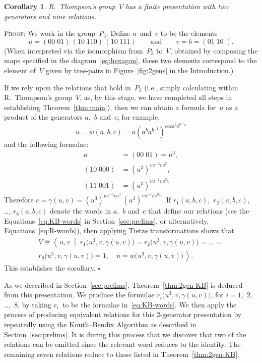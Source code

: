 \documentclass[a4paper,11pt]{article}
\numberwithin{equation}{section}
\newcommand{\nbd}{\nobreakdash-}
\newcommand{\swap}[2]{(#1\;#2)}
\newcommand{\qed}{\hspace*{\fill}$\square$}
\newtheorem{cor}[thm]{Corollary}
\newenvironment{proof}{%
  \begin{trivlist}\item\textsc{Proof:}}{\qed\end{trivlist}}
\begin{document}
\begin{cor}
  \label{cor:2gen-Tietze}
  R.~Thompson's group~$V$ has a finite presentation with two
  generators and nine relations.
\end{cor}

\begin{proof}
  We work in the group~$P_{3}$.  Define $u$~and~$v$ to be the elements
  \[
  u = \swap{00}{01} \, \swap{10}{110} \, \swap{10}{111}
  \qquad \text{and} \qquad
  v = b = ( 01 \; 10 \; ).
  \]
  (When interpreted via the isomorphism from~$P_{3}$ to~$V$, obtained
  by composing the maps specified in the diagram~\eqref{eq:hexagon},
  these two elements correspond to the element of~$V$ given by
  tree-pairs in Figure~\ref{fig:2gens} in the Introduction.)

  If we rely upon the relations that hold in~$P_{3}$ (i.e., simply
  calculating within R.~Thompson's group~$V$, as, by this stage, we
  have completed all steps in establishing Theorem~\ref{thm:main}),
  then we can obtain a formula for~$u$ as a product of the generators
  $a$,~$b$ and~$c$, for example,
  \[
  u = w(a,b,c) = a(a^ba^{b^{-1}})^{caca^{b}a^{b^{-1}a}}
  \]
  and the following formulae:
  \begin{align*}
    a &= \swap{00}{01} = u^{3}, \\
    \swap{10}{000} &= (u^{3})^{vu^{-2}vu^{3}}, \\
    \swap{11}{001} &= (u^{3})^{vu^{-1}vu^{3}v}
  \end{align*}
  Therefore $c = \gamma(u,v) = (u^{3})^{vu^{-2}vu^{3}} \,
  (u^{3})^{vu^{-1}vu^{3}v}$.  If $r_{1}(a,b,c)$,~$r_{2}(a,b,c)$,
  \dots, $r_{8}(a,b,c)$ denote the words in $a$,~$b$ and~$c$ that
  define our relations (see the Equations~\eqref{eq:KB-words} in
  Section~\ref{sec:prelims}, or alternatively,
  Equations~\eqref{eq:R-words}), then applying Tietze transformations
  shows that
  \begin{multline*}
    V \cong
    \left\langle \, u,v \; \middle| \; r_{1}\bigl(u^{3},v,\gamma(u,v)\bigr) =
    r_{2}\bigl(u^{3},v,\gamma(u,v)\bigr) = \dots = \right. \\
    \left. r_{8}\bigl(u^{3},v,\gamma(u,v)\bigr) = 1, 
    \quad u = w\bigl(u^{3},v,\gamma(u,v)\bigr) \, \right\rangle.
  \end{multline*}
  This establishes the corollary.
\end{proof}

As we described in Section~\ref{sec:prelims},
Theorem~\ref{thm:2gen-KB} is deduced from this presentation.  We
produce the formulae $r_{i}\bigl(u^{3},v,\gamma(u,v)\bigr)$, for $i =
1$,~$2$, \dots,~$8$, by taking $r_{i}$~to be the formulae
in~\eqref{eq:KB-words}.  We then apply the process of producing
equivalent relations for this $2$\nbd generator presentation by
repeatedly using the Knuth--Bendix Algorithm as described in
Section~\ref{sec:prelims}.  It is during this process that we discover
that two of the relations can be omitted since the relevant word
reduces to the identity.  The remaining seven relations reduce to
those listed in Theorem~\ref{thm:2gen-KB}.
\end{document}
